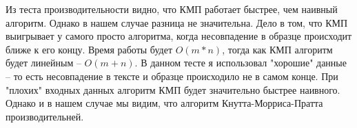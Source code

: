 Из теста производительности видно, что КМП работает быстрее, чем наивный алгоритм. Однако в нашем случае разница не значительна. Дело в том, что КМП выигрывает у самого просто алгоритма, когда несовпадение в образце происходит ближе к его концу. Время работы будет $O(m*n)$, тогда как КМП алгоритм будет линейным -- $O(m + n)$. В данном тесте я использовал "хорошие" данные -- то есть несовпадение в тексте и образце происходило не в самом конце. При "плохих" входных данных алгоритм КМП будет значительно быстрее наивного. Однако и в нашем случае мы видим, что алгоритм Кнутта-Морриса-Пратта производительней.
\pagebreak
